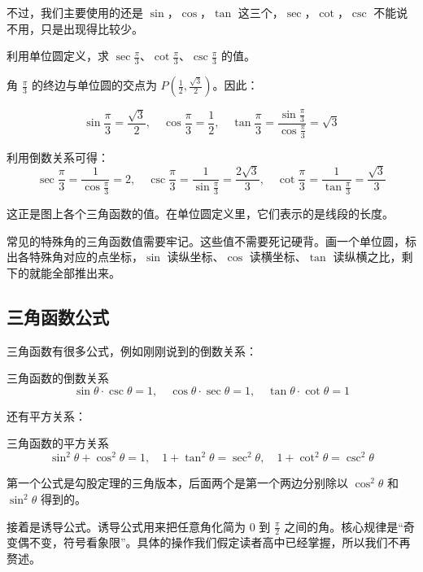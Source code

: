 不过，我们主要使用的还是 $\sin$，$\cos$，$\tan$ 这三个，$\sec$，$\cot$，$\csc$ 不能说不用，只是出现得比较少。

\begin{myexample}
  利用单位圆定义，求 $\sec\frac{\pi}{3}$、$\cot\frac{\pi}{3}$、$\csc\frac{\pi}{3}$ 的值。

角 $\frac{\pi}{3}$ 的终边与单位圆的交点为 $P\!(\frac{1}{2}, \frac{\sqrt{3}}{2})$。因此：

\[
\sin\frac{\pi}{3} = \frac{\sqrt{3}}{2},\quad 
\cos\frac{\pi}{3} = \frac{1}{2},\quad 
\tan\frac{\pi}{3} = \frac{\sin\frac{\pi}{3}}{\cos\frac{\pi}{3}} = \sqrt{3}
\]

利用倒数关系可得：
\[
\sec\frac{\pi}{3} = \frac{1}{\cos\frac{\pi}{3}} = 2,\quad 
\csc\frac{\pi}{3} = \frac{1}{\sin\frac{\pi}{3}} = \frac{2\sqrt{3}}{3},\quad 
\cot\frac{\pi}{3} = \frac{1}{\tan\frac{\pi}{3}} = \frac{\sqrt{3}}{3}
\]

\end{myexample}

这正是图上各个三角函数的值。在单位圆定义里，它们表示的是线段的长度。

常见的特殊角的三角函数值需要牢记。这些值不需要死记硬背。画一个单位圆，标出各特殊角对应的点坐标，$\sin$ 读纵坐标、$\cos$ 读横坐标、$\tan$ 读纵横之比，剩下的就能全部推出来。


\subsection{三角函数公式}

三角函数有很多公式，例如刚刚说到的倒数关系：
\begin{theorem}{三角函数的倒数关系}{}
\[
\sin\theta \cdot \csc\theta = 1,\quad
\cos\theta \cdot \sec\theta = 1,\quad
\tan\theta \cdot \cot\theta = 1
\]
\end{theorem}

还有平方关系：
\begin{theorem}{三角函数的平方关系}{}
\[
\sin^2\theta + \cos^2\theta = 1,\quad
1 + \tan^2\theta = \sec^2\theta,\quad
1 + \cot^2\theta = \csc^2\theta
\]
\end{theorem}

第一个公式是勾股定理的三角版本，后面两个是第一个两边分别除以 $\cos^2\theta$ 和 $\sin^2\theta$ 得到的。

接着是诱导公式。诱导公式用来把任意角化简为 $0$ 到 $\frac{\pi}{2}$ 之间的角。核心规律是“奇变偶不变，符号看象限”。具体的操作我们假定读者高中已经掌握，所以我们不再赘述。

